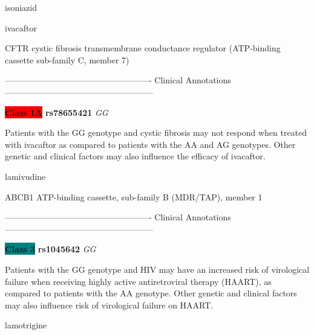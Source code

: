 \documentclass{resume} %
\begin{document}
\begin{rSection}{ isoniazid }
\end{rSection}\begin{rSection}{ ivacaftor }
\item[]

\begin{rSubsection}{ CFTR }{ cystic fibrosis transmembrane conductance regulator (ATP-binding cassette sub-family C, member 7) }{}{}
\item[]

\item[] ---------------------------------------------------- Clinical Annotations -----------------------------------------------------\newline
\item \textbf{\colorbox{red} {Class 1A}} \textbf{ rs78655421 } \textit{ GG }
\item[] Patients with the GG genotype and cystic fibrosis may not respond when treated with ivacaftor as compared to patients with the AA and AG genotypes. Other genetic and clinical factors may also influence the efficacy of ivacaftor.
\end{rSubsection}

\end{rSection}\begin{rSection}{ lamivudine }
\item[]

\begin{rSubsection}{ ABCB1 }{ ATP-binding cassette, sub-family B (MDR/TAP), member 1 }{}{}
\item[]

\item[] ---------------------------------------------------- Clinical Annotations -----------------------------------------------------\newline
\item \textbf{\colorbox{teal} {Class 3}} \textbf{ rs1045642 } \textit{ GG }
\item[] Patients with the GG genotype and HIV may have an increased risk of virological failure when receiving highly active antiretroviral therapy (HAART), as compared to patients with the AA genotype. Other genetic and clinical factors may also influence risk of virological failure on HAART.
\end{rSubsection}

\end{rSection}\begin{rSection}{ lamotrigine }
\item[]


\end{rSection}
\end{document}
